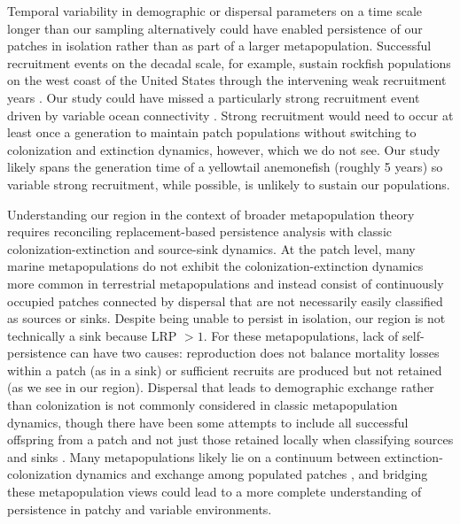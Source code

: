 \documentclass[12pt, oneside]{article}   	%
\begin{document}
Temporal variability in demographic or dispersal parameters on a time scale longer than our sampling alternatively could have enabled persistence of our patches in isolation \citep[similar to the storage effect,][]{warner1985coexistence} rather than as part of a larger metapopulation. Successful recruitment events on the decadal scale, for example, sustain rockfish populations on the west coast of the United States through the intervening weak recruitment years \citep[e.g.][]{tolimieri2005roles}. Our study could have missed a particularly strong recruitment event driven by variable ocean connectivity \citep[simulations suggest that 20 years are necessary to capture the full extent of ocean variability in the Coral Triangle region surrounding our patches;][]{thompson2018variability}. Strong recruitment would need to occur at least once a generation to maintain patch populations without switching to colonization and extinction dynamics, however, which we do not see. Our study likely spans the generation time of a yellowtail anemonefish (roughly 5 years) so variable strong recruitment, while possible, is unlikely to sustain our populations.

Understanding our region in the context of broader metapopulation theory requires reconciling replacement-based persistence analysis with classic colonization-extinction and source-sink dynamics. At the patch level, many marine metapopulations do not exhibit the colonization-extinction dynamics \citep[or do only on a decades to centuries timescale,][]{smedbol2002myths} more common in terrestrial metapopulations \citep[e.g. in butterflies and pikas;][]{hanski1998metapopulation, moilanen1998long} and instead consist of continuously occupied patches connected by dispersal \citep{kritzer2006marine} that are not necessarily easily classified as sources or sinks. Despite being unable to persist in isolation, our region is not technically a sink \citep{pulliam1988sources} because LRP $> 1$. For these metapopulations, lack of self-persistence can have two causes: reproduction does not balance mortality losses within a patch (as in a sink) or sufficient recruits are produced but not retained (as we see in our region). Dispersal that leads to demographic exchange rather than colonization is not commonly considered in classic metapopulation dynamics, though there have been some attempts to include all successful offspring from a patch and not just those retained locally when classifying sources and sinks \citep{figueira2006defining}. Many metapopulations likely lie on a continuum between extinction-colonization dynamics and exchange among populated patches \citep{kritzer2006marine}, and bridging these metapopulation views could lead to a more complete understanding of persistence in patchy and variable environments.
\end{document}
